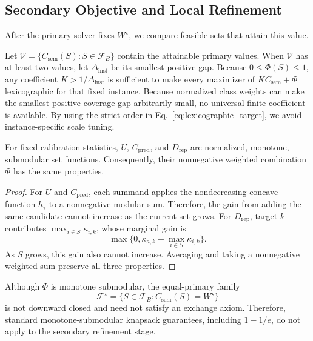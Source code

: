 \subsection{Secondary Objective and Local Refinement}

After the primary solver fixes $W^\star$, we compare feasible sets that attain
this value.

Let $\mathcal V=\{C_{\mathrm{sem}}(S):S\in\mathcal F_B\}$ contain the
attainable primary values. When $\mathcal V$ has at least two values, let
$\Delta_{\mathrm{inst}}$ be its smallest positive gap. Because
$0\le\Phi(S)\le1$, any coefficient $K>1/\Delta_{\mathrm{inst}}$ is sufficient
to make every maximizer of $KC_{\mathrm{sem}}+\Phi$ lexicographic for that
fixed instance. Because normalized class weights can make the smallest positive
coverage gap arbitrarily small, no universal finite coefficient is available.
By using the strict order in
Eq.~\ref{eq:lexicographic_target}, we avoid instance-specific scale tuning.

\begin{proposition}
\label{prop:secondary_structure}
For fixed calibration statistics, $U$, $C_{\mathrm{pred}}$, and
$D_{\mathrm{rep}}$ are normalized, monotone, submodular set functions.
Consequently, their nonnegative weighted combination $\Phi$ has the same
properties.
\end{proposition}

\begin{proof}
For $U$ and $C_{\mathrm{pred}}$, each summand applies the nondecreasing
concave function $h_\tau$ to a nonnegative modular sum. Therefore, the gain
from adding the same candidate cannot increase as the current set grows. For
$D_{\mathrm{rep}}$, target $k$ contributes
$\max_{i\in S}\kappa_{i,k}$, whose marginal gain is
\[
\max\{0,\kappa_{a,k}-\max_{i\in S}\kappa_{i,k}\}.
\]
As $S$ grows, this gain also cannot increase. Averaging and taking a
nonnegative weighted sum preserve all three properties.
\end{proof}

Although $\Phi$ is monotone submodular, the equal-primary family
\begin{equation}
\mathcal F^\star=
\{S\in\mathcal F_B:C_{\mathrm{sem}}(S)=W^\star\}
\end{equation}
is not downward closed and need not satisfy an exchange axiom. Therefore,
standard monotone-submodular knapsack guarantees, including $1-1/e$, do not
apply to the secondary refinement stage.

